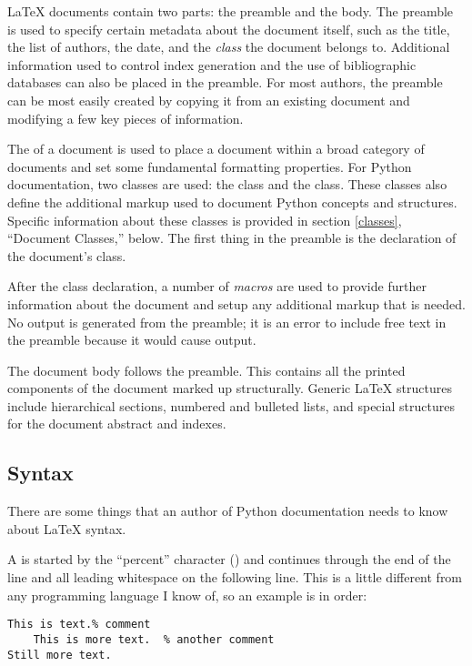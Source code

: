 \documentclass{howto}
\begin{document}
  \LaTeX{} documents contain two parts: the preamble and the body.
  The preamble is used to specify certain metadata about the document
  itself, such as the title, the list of authors, the date, and the
  \emph{class} the document belongs to.  Additional information used
  to control index generation and the use of bibliographic databases
  can also be placed in the preamble.  For most authors, the preamble
  can be most easily created by copying it from an existing document
  and modifying a few key pieces of information.

  The  of a document is used to place a document within a
  broad category of documents and set some fundamental formatting
  properties.  For Python documentation, two classes are used: the
   class and the  class.  These classes also
  define the additional markup used to document Python concepts and
  structures.  Specific information about these classes is provided in
  section \ref{classes}, ``Document Classes,'' below.  The first thing
  in the preamble is the declaration of the document's class.

  After the class declaration, a number of \emph{macros} are used to
  provide further information about the document and setup any
  additional markup that is needed.  No output is generated from the
  preamble; it is an error to include free text in the preamble
  because it would cause output.

  The document body follows the preamble.  This contains all the
  printed components of the document marked up structurally.  Generic
  \LaTeX{} structures include hierarchical sections, numbered and
  bulleted lists, and special structures for the document abstract and
  indexes.

  \subsection{Syntax \label{latex-syntax}}

    There are some things that an author of Python documentation needs
    to know about \LaTeX{} syntax.

    A  is started by the ``percent'' character
    (\character{\%}) and continues through the end of the line and all
    leading whitespace on the following line.  This is a little
    different from any programming language I know of, so an example
    is in order:

\begin{verbatim}
This is text.% comment
    This is more text.  % another comment
Still more text.
\end{verbatim}
\end{document}
